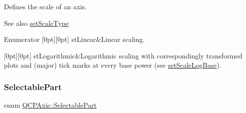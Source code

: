 Defines the scale of an axis. \begin{DoxySeeAlso}{See also}
\mbox{\hyperlink{class_q_c_p_axis_adef29cae617af4f519f6c40d1a866ca6}{set\+Scale\+Type}} 
\end{DoxySeeAlso}
\begin{DoxyEnumFields}{Enumerator}
[0pt][0pt]{}\mbox{\label{class_q_c_p_axis_a36d8e8658dbaa179bf2aeb973db2d6f0aff6e30a11a828bc850caffab0ff994f6}} 
st\+Linear&Linear scaling. \\
\hline

[0pt][0pt]{}\mbox{\label{class_q_c_p_axis_a36d8e8658dbaa179bf2aeb973db2d6f0abf5b785ad976618816dc6f79b73216d4}} 
st\+Logarithmic&Logarithmic scaling with correspondingly transformed plots and (major) tick marks at every base power (see \mbox{\hyperlink{class_q_c_p_axis_a726186054be90487885a748aa1b42188}{set\+Scale\+Log\+Base}}). \\
\hline

\end{DoxyEnumFields}
\mbox{\label{class_q_c_p_axis_abee4c7a54c468b1385dfce2c898b115f}} 
\subsubsection{\texorpdfstring{Selectable\+Part}{SelectablePart}}
{\footnotesize\ttfamily enum \mbox{\hyperlink{class_q_c_p_axis_abee4c7a54c468b1385dfce2c898b115f}{Q\+C\+P\+Axis\+::\+Selectable\+Part}}}

